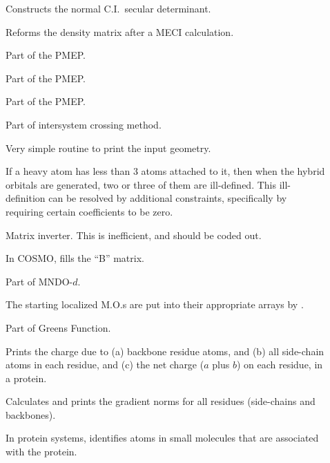 \begin{description}
\item[] Constructs the normal C.I.\ secular determinant.

\item[] Reforms the density matrix after a MECI calculation.

\item[] Part of the PMEP.

\item[] Part of the PMEP.

\item[] Part of the PMEP.

\item[] Part of intersystem crossing method.

\item[] Very simple routine to print the input geometry.

\item[] If a heavy atom has less than 3 atoms attached to it, then
when the hybrid orbitals are generated, two or three of them are ill-defined.
This ill-definition can be resolved by additional constraints, specifically by
requiring certain coefficients to be zero.

\item[] Matrix inverter.  This is inefficient, and should be coded
out.

\item[] In COSMO, fills the ``B'' matrix.

\item[] Part of MNDO-$d$.

\item[] The starting localized M.O.s are put into their appropriate
arrays by .

\item[] Part of Greens Function.

\item[] Prints the charge due to (a) backbone residue atoms, and
(b) all side-chain atoms in each residue, and (c) the net charge ($a$ plus $b$)
on each residue, in a protein.

\item[] Calculates and prints the gradient norms for all residues
(side-chains and backbones).

\item[] In protein systems,  identifies atoms in
small molecules that are associated with the protein.


\end{description}
